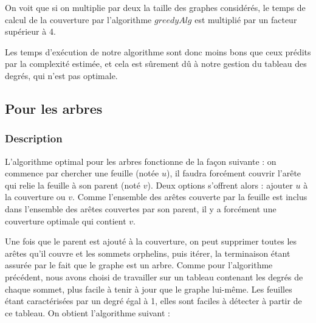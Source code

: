 \documentclass[a4paper,10pt]{article}
\begin{document}
On voit que si on multiplie par deux la taille des graphes considérés, le temps de calcul de la couverture par l'algorithme $greedyAlg$ est multiplié par un facteur supérieur à 4.  %



Les temps d'exécution de notre algorithme sont donc moins bons que ceux prédits par la complexité estimée, et cela est sûrement dû à notre gestion du tableau des degrés, qui n'est pas optimale.

\subsection{Pour les arbres}

\subsubsection{Description}

L'algorithme optimal pour les arbres fonctionne de la façon suivante : on commence par chercher une feuille (notée $u$), il faudra forcément couvrir l'arête qui relie la feuille à son parent (noté $v$). Deux options s'offrent alors : ajouter $u$ à la couverture ou $v$. Comme l'ensemble des arêtes couverte par la feuille est inclus dans l'ensemble des arêtes couvertes par son parent, il y a forcément une couverture optimale qui contient $v$. 

Une fois que le parent est ajouté à la couverture, on peut supprimer toutes les arêtes qu'il couvre et les sommets orphelins, puis itérer, la terminaison étant assurée par le fait que le graphe est un arbre. Comme pour l'algorithme précédent, nous avons choisi de travailler sur un tableau contenant les degrés de chaque sommet, plus facile à tenir à jour que le graphe lui-même. Les feuilles étant caractérisées par un degré égal à 1, elles sont faciles à détecter à partir de ce tableau. On obtient l'algorithme suivant :
\end{document}
